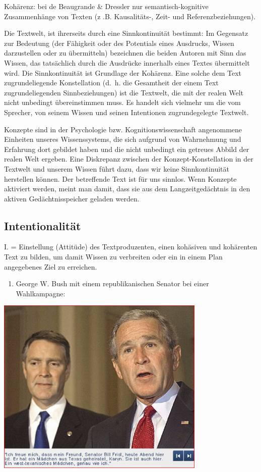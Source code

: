\documentclass[
  letterpaper,
  DIV=11,
  numbers=noendperiod]{scrreprt}
\providecommand{\tightlist}{%
  \setlength{\itemsep}{0pt}\setlength{\parskip}{0pt}}\usepackage{longtable,booktabs,array}
\begin{document}
Kohärenz: bei de Beaugrande \& Dressler nur semantisch-kognitive
Zusammenhänge von Texten (z .B. Kausalitäts-, Zeit- und
Referenzbeziehungen).

Die Textwelt, ist ihrerseits durch eine Sinnkontinuität bestimmt: Im
Gegensatz zur Bedeutung (der Fähigkeit oder des Potentials eines
Ausdrucks, Wissen darzustellen oder zu übermitteln) bezeichnen die
beiden Autoren mit Sinn das Wissen, das tatsächlich durch die Ausdrücke
innerhalb eines Textes übermittelt wird. Die Sinnkontinuität ist
Grundlage der Kohärenz. Eine solche dem Text zugrundeliegende
Konstellation (d.~h. die Gesamtheit der einem Text zugrundeliegenden
Sinnbeziehungen) ist die Textwelt, die mit der realen Welt nicht
unbedingt übereinstimmen muss. Es handelt sich vielmehr um die vom
Sprecher, von seinem Wissen und seinen Intentionen zugrundegelegte
Textwelt.

Konzepte sind in der Psychologie bzw. Kognitionswissenschaft angenommene
Einheiten unseres Wissenssystems, die sich aufgrund von Wahrnehmung und
Erfahrung dort gebildet haben und die nicht unbedingt ein getreues
Abbild der realen Welt ergeben. Eine Diskrepanz zwischen der
Konzept-Konstellation in der Textwelt und unserem Wissen führt dazu,
dass wir keine Sinnkontinuität herstellen können. Der betreffende Text
ist für uns sinnlos. Wenn Konzepte aktiviert werden, meint man damit,
dass sie aus dem Langzeitgedächtnis in den aktiven Gedächtnisspeicher
geladen werden.

\hypertarget{intentionalituxe4t}{%
\subsection{Intentionalität}\label{intentionalituxe4t}}

I. = Einstellung (Attitüde) des Textproduzenten, einen kohäsiven und
kohärenten Text zu bilden, um damit Wissen zu verbreiten oder ein in
einem Plan angegebenes Ziel zu erreichen.

\begin{enumerate}
\def\labelenumi{(\arabic{enumi})}
\setcounter{enumi}{10}
\tightlist
\item
  George W. Bush mit einem republikanischen Senator bei einer
  Wahlkampagne:
\end{enumerate}

\includegraphics[width=0.75\textwidth,height=\textheight]{./pictures/textkriterien_7.png}
\end{document}

